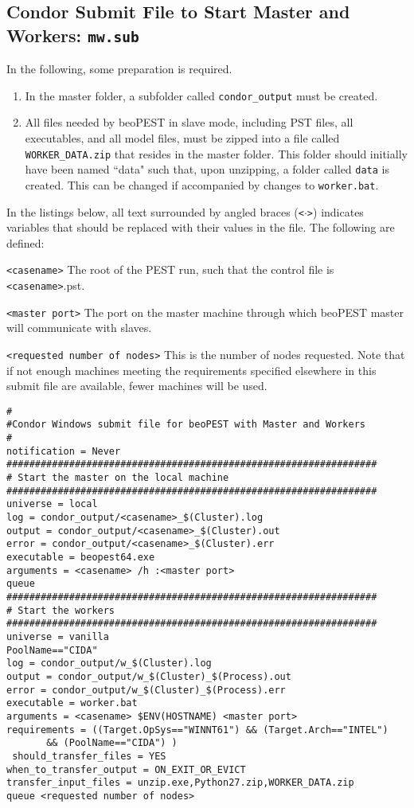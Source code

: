 \documentclass[11pt,twoside,onecolumn]{usgsreport}
\begin{document}
\subsection{Condor Submit File to Start Master and Workers: \texttt{mw.sub}}
In the following, some preparation is required.
\begin{enumerate}
\item{}In the master folder, a subfolder called \texttt{condor\_output} must be created.
\item{}All files needed by beoPEST in slave mode, including PST files, all executables, and all model files, must be zipped into a file called \texttt{WORKER\_DATA.zip} that resides in the master folder. This folder should initially have been named ``data" such that, upon unzipping, a folder called \texttt{data} is created. This can be changed if accompanied by changes to \texttt{worker.bat}.
\end{enumerate}
In the listings below, all text surrounded by angled braces (\texttt{<$\cdot$>}) indicates variables that should be replaced with their values in the file. The following are defined:
\begin{description}
\item{\texttt{<casename>}} The root of the PEST run, such that the control file is \texttt{<casename>}.pst.
\item{\texttt{<master port>}} The port on the master machine through which beoPEST master will communicate with slaves.
\item{\texttt{<requested number of nodes>}} This is the number of nodes requested. Note that if not enough machines meeting the requirements specified elsewhere in this submit file are available, fewer machines will be used.
\end{description}
\begin{lstlisting}
#
#Condor Windows submit file for beoPEST with Master and Workers
#
notification = Never
#################################################################
# Start the master on the local machine
#################################################################
universe = local
log = condor_output/<casename>_$(Cluster).log
output = condor_output/<casename>_$(Cluster).out
error = condor_output/<casename>_$(Cluster).err
executable = beopest64.exe
arguments = <casename> /h :<master port>
queue
#################################################################
# Start the workers
#################################################################
universe = vanilla
PoolName=="CIDA"
log = condor_output/w_$(Cluster).log
output = condor_output/w_$(Cluster)_$(Process).out
error = condor_output/w_$(Cluster)_$(Process).err
executable = worker.bat
arguments = <casename> $ENV(HOSTNAME) <master port>
requirements = ((Target.OpSys=="WINNT61") && (Target.Arch=="INTEL")
       && (PoolName=="CIDA") )
 should_transfer_files = YES
when_to_transfer_output = ON_EXIT_OR_EVICT
transfer_input_files = unzip.exe,Python27.zip,WORKER_DATA.zip
queue <requested number of nodes>
\end{lstlisting}
\newpage
\end{document}
